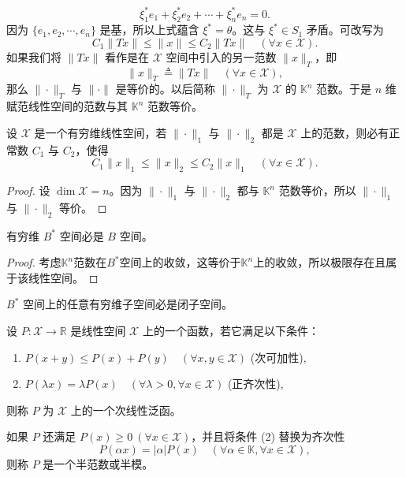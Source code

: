 \documentclass[lang=cn,newtx,10pt,scheme=chinese,thmcnt=chapter]{elegantbook}
\begin{document}
\[
\xi_1^* e_1 + \xi_2^* e_2 + \cdots + \xi_n^* e_n = 0.
\]
因为 \(\{e_1, e_2, \cdots, e_n\}\) 是基，所以上式蕴含 \(\xi^* = \theta\)。这与 \(\xi^* \in S_1\) 矛盾。可改写为
\[
C_1 \|T x\| \leqslant \|x\| \leqslant C_2 \|T x\| \quad (\forall x \in \mathscr{X}).
\]
如果我们将 \(\|T x\|\) 看作是在 \(\mathscr{X}\) 空间中引入的另一范数 \(\|x\|_T\)，即
\[
\|x\|_T \triangleq \|T x\| \quad (\forall x \in \mathscr{X}),
\]
那么 \(\|\cdot\|_T\) 与 \(\|\cdot\|\) 是等价的。以后简称 \(\|\cdot\|_T\) 为 \(\mathscr{X}\) 的 \(\mathbb{K}^n\) 范数。于是 \(n\) 维赋范线性空间的范数与其 \(\mathbb{K}^n\) 范数等价。
\begin{theorem}
设 \(\mathscr{X}\) 是一个有穷维线性空间，若 \(\|\cdot\|_1\) 与 \(\|\cdot\|_2\) 都是 \(\mathscr{X}\) 上的范数，则必有正常数 \(C_1\) 与 \(C_2\)，使得
\[
C_1 \|x\|_1 \leqslant \|x\|_2 \leqslant C_2 \|x\|_1 \quad (\forall x \in \mathscr{X}).
\]
\end{theorem}
\begin{proof}
设 \(\operatorname{dim} \mathscr{X} = n\)。因为 \(\|\cdot\|_1\) 与 \(\|\cdot\|_2\) 都与 \(\mathbb{K}^n\) 范数等价，所以 \(\|\cdot\|_1\) 与 \(\|\cdot\|_2\) 等价。
\end{proof}
\begin{corollary}
有穷维 ${B}^*$ 空间必是 ${B}$ 空间。
\end{corollary}
\begin{proof}
    考虑$\mathbb{K}^n$范数在${B}^*$空间上的收敛，这等价于$\mathbb{K}^n$上的收敛，所以极限存在且属于该线性空间。
\end{proof}
\begin{corollary}
${B}^*$ 空间上的任意有穷维子空间必是闭子空间。
\end{corollary}

\begin{definition}
设 $P: \mathscr{X} \to \mathbb{R}$ 是线性空间 $\mathscr{X}$ 上的一个函数，若它满足以下条件：
\begin{enumerate}
    \item \(P(x + y) \leqslant P(x) + P(y) \quad (\forall x, y \in \mathscr{X})\) \hfill (次可加性),
    \item \(P(\lambda x) = \lambda P(x) \quad (\forall \lambda > 0, \forall x \in \mathscr{X})\) \hfill (正齐次性),
\end{enumerate}
则称 $P$ 为 $\mathscr{X}$ 上的一个次线性泛函。
\end{definition}
\begin{note}如果 $P$ 还满足 $P(x) \geqslant 0 \ (\forall x \in \mathscr{X})$，并且将条件 (2) 替换为齐次性
\[
P(\alpha x) = |\alpha| P(x) \quad (\forall \alpha \in \mathbb{K}, \forall x \in \mathscr{X}),
\]
则称 $P$ 是一个半范数或半模。
\end{note}
\end{document}
